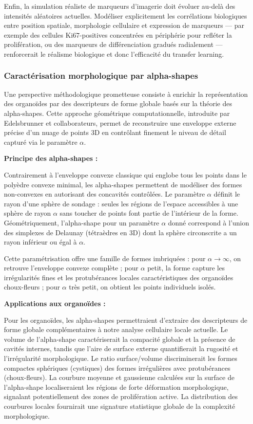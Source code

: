 Enfin, la simulation réaliste de marqueurs d'imagerie doit évoluer au-delà des intensités aléatoires actuelles. Modéliser explicitement les corrélations biologiques entre position spatiale, morphologie cellulaire et expression de marqueurs — par exemple des cellules Ki67-positives concentrées en périphérie pour refléter la prolifération, ou des marqueurs de différenciation gradués radialement — renforcerait le réalisme biologique et donc l'efficacité du transfer learning.

\subsubsection{Caractérisation morphologique par alpha-shapes}

Une perspective méthodologique prometteuse consiste à enrichir la représentation des organoïdes par des descripteurs de forme globale basés sur la théorie des alpha-shapes. Cette approche géométrique computationnelle, introduite par Edelsbrunner et collaborateurs, permet de reconstruire une enveloppe externe précise d'un nuage de points 3D en contrôlant finement le niveau de détail capturé via le paramètre $\alpha$.

\textbf{Principe des alpha-shapes :}

Contrairement à l'enveloppe convexe classique qui englobe tous les points dans le polyèdre convexe minimal, les alpha-shapes permettent de modéliser des formes non-convexes en autorisant des concavités contrôlées. Le paramètre $\alpha$ définit le rayon d'une sphère de sondage : seules les régions de l'espace accessibles à une sphère de rayon $\alpha$ sans toucher de points font partie de l'intérieur de la forme. Géométriquement, l'alpha-shape pour un paramètre $\alpha$ donné correspond à l'union des simplexes de Delaunay (tétraèdres en 3D) dont la sphère circonscrite a un rayon inférieur ou égal à $\alpha$.

Cette paramétrisation offre une famille de formes imbriquées : pour $\alpha \to \infty$, on retrouve l'enveloppe convexe complète ; pour $\alpha$ petit, la forme capture les irrégularités fines et les protubérances locales caractéristiques des organoïdes choux-fleurs ; pour $\alpha$ très petit, on obtient les points individuels isolés.

\textbf{Applications aux organoïdes :}

Pour les organoïdes, les alpha-shapes permettraient d'extraire des descripteurs de forme globale complémentaires à notre analyse cellulaire locale actuelle. Le volume de l'alpha-shape caractériserait la compacité globale et la présence de cavités internes, tandis que l'aire de surface externe quantifierait la rugosité et l'irrégularité morphologique. Le ratio surface/volume discriminerait les formes compactes sphériques (cystiques) des formes irrégulières avec protubérances (choux-fleurs). La courbure moyenne et gaussienne calculées sur la surface de l'alpha-shape localiseraient les régions de forte déformation morphologique, signalant potentiellement des zones de prolifération active. La distribution des courbures locales fournirait une signature statistique globale de la complexité morphologique.

